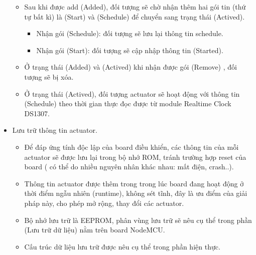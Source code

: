 \documentclass[a4paper,12pt,oneside]{article}
\begin{document}
\begin{itemize}
\begin{itemize}
	\item Sau khi được add (Added), đối tượng sẽ chờ nhận thêm hai gói tin (thứ tự bất kì) là (Start) và (Schedule) để chuyển sang trạng thái (Actived).
		\begin{itemize}
			\item Nhận gói (Schedule): đối tượng sẽ lưu lại thông tin schedule.
			\item Nhận gói (Start): đối tượng sẽ cập nhập thông tin (Started). 
		\end{itemize}			

	\item Ở trạng thái (Added) và (Actived) khi nhận được gói (Remove) , đối tượng sẽ bị xóa.
	\item Ở trạng thái (Actived), đối tượng actuator sẽ hoạt động với thông tin (Schedule) theo thời gian thực đọc được từ module Realtime Clock DS1307.
	\end{itemize}
\item Lưu trữ thông tin actuator.

	\begin{itemize}
	\item Để đáp ứng tính độc lập của board điều khiển, các thông tin của mỗi actuator sẽ được lưu lại trong bộ nhớ ROM, tránh trường hợp reset của board ( có thể do nhiều nguyên nhân khác nhau: mất điện, crash..).
	\item Thông tin actuator được thêm trong trong lúc board đang hoạt động ở thời điểm ngẫu nhiên (runtime), không sét tĩnh, đây là ưu điểm của giải pháp này, cho phép mở rộng, thay đổi các actuator.
	\item Bộ nhớ lưu trữ là EEPROM, phân vùng lưu trữ sẽ nêu cụ thể trong phần (Lưu trữ dữ liệu) nằm trên board NodeMCU.
	\item Cấu trúc dữ liệu lưu trữ được nêu cụ thể trong phần hiện thực.
	\end{itemize}
	
\end{itemize}
\end{document}
